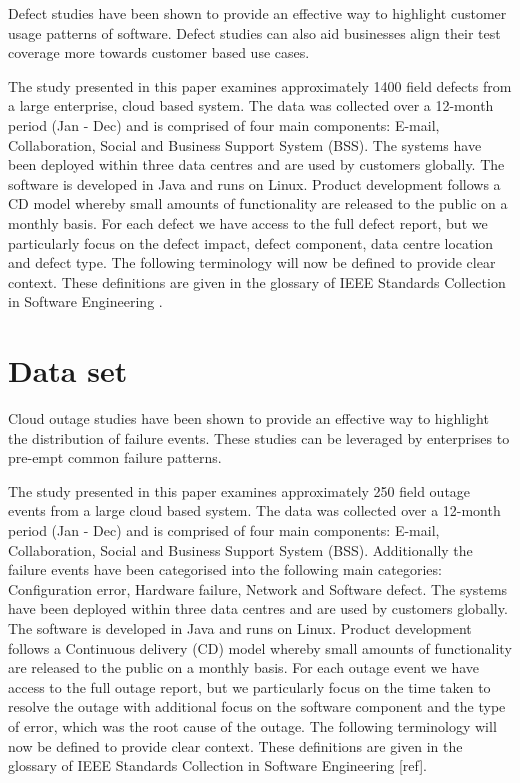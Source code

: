 \documentclass[conference]{IEEEtran}
\begin{document}
Defect studies have been shown to provide an effective way to highlight customer usage patterns of software. Defect studies can also aid businesses align their test coverage more towards customer based use cases. \par
The study presented in this paper examines approximately 1400 field defects from a large enterprise, cloud based system. The data was collected over a 12-month period (Jan - Dec) and is comprised of four main components: E-mail, Collaboration, Social and Business Support System (BSS). The systems have been deployed within three data centres and are used by customers globally. The software is developed in Java and runs on Linux. Product development follows a CD model whereby small amounts of functionality are released to the public on a monthly basis.  For each defect we have access to the full defect report, but we particularly focus on the defect impact, defect component, data centre location and defect type. 
The following terminology will now be defined to provide clear context. These definitions are given in the glossary of IEEE Standards Collection in Software Engineering \cite{ieee1998ieee}. 

\section{Data set}

Cloud outage studies have been shown to provide an effective way to highlight the distribution of failure events. These studies can be leveraged by enterprises to pre-empt common failure patterns. \par

The study presented in this paper examines approximately 250 field outage events from a large cloud based system. The data was collected over a 12-month period (Jan - Dec) and is comprised of four main components: E-mail, Collaboration, Social and Business Support System (BSS). Additionally the failure events have been categorised into the following main categories: Configuration error, Hardware failure, Network and Software defect. The systems have been deployed within three data centres and are used by customers globally. The software is developed in Java and runs on Linux. Product development follows a Continuous delivery (CD) model whereby small amounts of functionality are released to the public on a monthly basis. For each outage event we have access to the full outage report, but we particularly focus on the time taken to resolve the outage with additional focus on the software component and the type of error, which was the root cause of the outage. The following terminology will now be defined to provide clear context. These definitions are given in the glossary of IEEE Standards Collection in Software Engineering [ref]. \par
\end{document}
